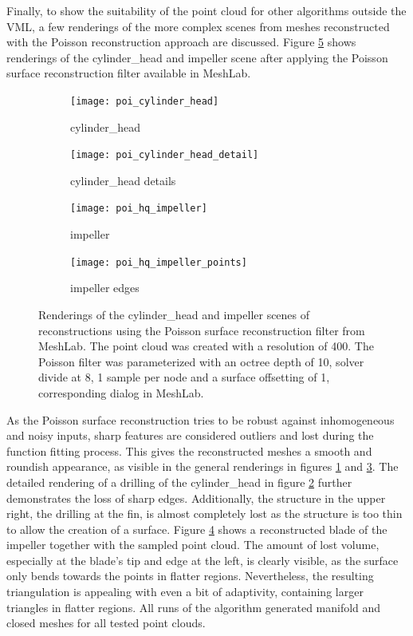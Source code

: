 Finally, to show the suitability of the point cloud for other algorithms outside the VML, a few renderings of the more complex scenes from meshes reconstructed with the Poisson reconstruction approach are discussed.
Figure \ref{fig:poisson_results} shows renderings of the cylinder\_head and impeller scene after applying the Poisson surface reconstruction filter available in MeshLab.
%
\begin{figure}
	\centering
	\begin{subfigure}[b]{0.49\textwidth}
		\centering
		\texttt{[image: poi\_cylinder\_head]}
		\caption{cylinder\_head}
		\label{fig:poi_cylinder_head}
	\end{subfigure}
	\begin{subfigure}[b]{0.49\textwidth}
		\centering
		\texttt{[image: poi\_cylinder\_head\_detail]}
		\caption{cylinder\_head details}
		\label{fig:poi_cylinder_head_detail}
	\end{subfigure}
	\begin{subfigure}[b]{0.49\textwidth}
		\centering
		\texttt{[image: poi\_hq\_impeller]}
		\caption{impeller}
		\label{fig:poi_hq_impeller}
	\end{subfigure}
	\begin{subfigure}[b]{0.49\textwidth}
		\centering
		\texttt{[image: poi\_hq\_impeller\_points]}
		\caption{impeller edges}
		\label{fig:poi_hq_impeller_points}
	\end{subfigure}
	\caption{
		Renderings of the cylinder\_head and impeller scenes of reconstructions using the Poisson surface reconstruction filter from MeshLab.
		The point cloud was created with a resolution of 400.
		The Poisson filter was parameterized with an octree depth of 10, solver divide at 8, 1 sample per node and a surface offsetting of 1, \cf corresponding dialog in MeshLab.
	}
	\label{fig:poisson_results}
\end{figure}
%
As the Poisson surface reconstruction tries to be robust against inhomogeneous and noisy inputs, sharp features are considered outliers and lost during the function fitting process.
This gives the reconstructed meshes a smooth and roundish appearance, as visible in the general renderings in figures \ref{fig:poi_cylinder_head} and \ref{fig:poi_hq_impeller}.
The detailed rendering of a drilling of the cylinder\_head in figure \ref{fig:poi_cylinder_head_detail} further demonstrates the loss of sharp edges.
Additionally, the structure in the upper right, the drilling at the fin, is almost completely lost as the structure is too thin to allow the creation of a surface.
Figure \ref{fig:poi_hq_impeller_points} shows a reconstructed blade of the impeller together with the sampled point cloud.
The amount of lost volume, especially at the blade's tip and edge at the left, is clearly visible, as the surface only bends towards the points in flatter regions.
Nevertheless, the resulting triangulation is appealing with even a bit of adaptivity, containing larger triangles in flatter regions.
All runs of the algorithm generated manifold and closed meshes for all tested point clouds.

